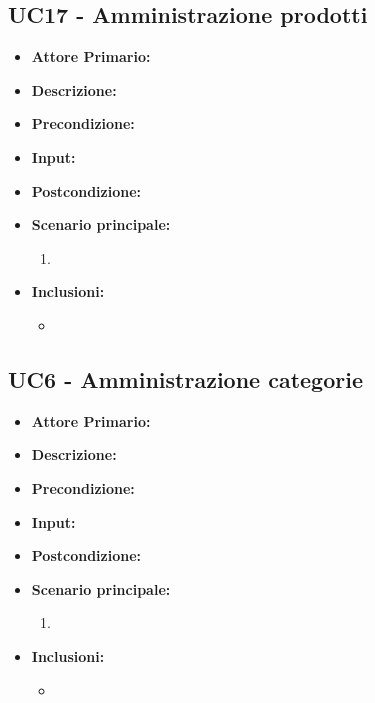\subsection{UC17 - Amministrazione prodotti}
\begin{itemize}
    \item \textbf{Attore Primario:} 
    \item \textbf{Descrizione:}
    \item \textbf{Precondizione:}
    \item \textbf{Input:}
    \item \textbf{Postcondizione:}
    \item \textbf{Scenario principale:}
    \begin{enumerate}
        \item 
    \end{enumerate}
    \item \textbf{Inclusioni:}
    \begin{itemize}
        \item
    \end{itemize}
\end{itemize}
\subsection{UC6 - Amministrazione categorie}
\begin{itemize}
    \item \textbf{Attore Primario:} 
    \item \textbf{Descrizione:}
    \item \textbf{Precondizione:}
    \item \textbf{Input:}
    \item \textbf{Postcondizione:}
    \item \textbf{Scenario principale:}
    \begin{enumerate}
        \item 
    \end{enumerate}
    \item \textbf{Inclusioni:}
    \begin{itemize}
        \item
    \end{itemize}
\end{itemize}
